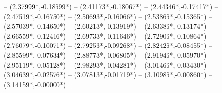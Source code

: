 {	-- ({2.37999*\dx},{-0.18699*\dy})
	-- ({2.41173*\dx},{-0.18067*\dy})
	-- ({2.44346*\dx},{-0.17417*\dy})
	-- ({2.47519*\dx},{-0.16750*\dy})
	-- ({2.50693*\dx},{-0.16066*\dy})
	-- ({2.53866*\dx},{-0.15365*\dy})
	-- ({2.57039*\dx},{-0.14650*\dy})
	-- ({2.60213*\dx},{-0.13919*\dy})
	-- ({2.63386*\dx},{-0.13174*\dy})
	-- ({2.66559*\dx},{-0.12416*\dy})
	-- ({2.69733*\dx},{-0.11646*\dy})
	-- ({2.72906*\dx},{-0.10864*\dy})
	-- ({2.76079*\dx},{-0.10071*\dy})
	-- ({2.79253*\dx},{-0.09268*\dy})
	-- ({2.82426*\dx},{-0.08455*\dy})
	-- ({2.85599*\dx},{-0.07634*\dy})
	-- ({2.88773*\dx},{-0.06805*\dy})
	-- ({2.91946*\dx},{-0.05970*\dy})
	-- ({2.95119*\dx},{-0.05128*\dy})
	-- ({2.98293*\dx},{-0.04281*\dy})
	-- ({3.01466*\dx},{-0.03430*\dy})
	-- ({3.04639*\dx},{-0.02576*\dy})
	-- ({3.07813*\dx},{-0.01719*\dy})
	-- ({3.10986*\dx},{-0.00860*\dy})
	-- ({3.14159*\dx},{-0.00000*\dy})
}

